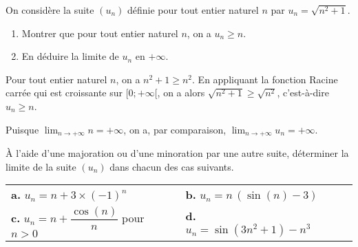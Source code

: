 \documentclass[11pt,fleqn, openany]{book} %
\begin{document}
\begin{exercise}On considère la suite $(u_n)$ définie pour tout entier naturel $n$ par $u_n=\sqrt{n^2+1}$.
\begin{enumerate}
\item Montrer que pour tout entier naturel $n$, on a $u_n \geqslant n$.
\item En déduire la limite de $u_n$ en $+\infty$.
\end{enumerate}\end{exercise}

\begin{solution}Pour tout entier naturel $n$, on a $n^2+1 \geqslant n^2$. En appliquant la fonction Racine carrée qui est croissante sur $[0;+\infty[$, on a alors $\sqrt{n^2+1} \geqslant \sqrt{n^2}$, c'est-à-dire $u_n \geqslant n$.

Puisque $\displaystyle\lim_{n \to + \infty} n=+\infty$, on a, par comparaison, $\displaystyle\lim_{n \to + \infty}u_n=+\infty$.\end{solution}




\begin{exercise}À l'aide d'une majoration ou d'une minoration par une autre suite, déterminer la limite de la suite $(u_n)$ dans chacun des cas suivants.
\renewcommand{\arraystretch}{2.2}
\begin{center}
\begin{tabularx}{\linewidth}{XXXX}
\textbf{a.} $ u_n = n+3\times (-1)^n$ & \textbf{b.} $ u_n=n\,(\sin(n)-3)$ \\
\textbf{c.} $ u_n = n+\dfrac{\cos(n)}{n}$ pour $n>0$ & \textbf{d.} $u_n=\sin(3n^2+1)-n^3$ \\
\end{tabularx}
\end{center}\end{exercise}
\end{document}
